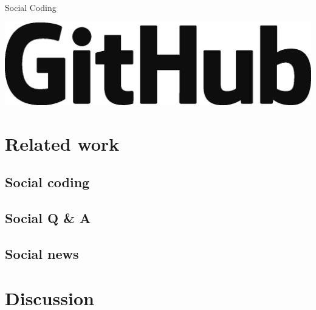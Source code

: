 \documentclass{beamer}
\newcommand{\coloreddot}[1][black]{\Large\textcolor{#1}{\ensuremath\bullet}}
\begin{document}
\begin{frame}{Social Coding}
  \begin{center}
    \includegraphics[width=.6\textwidth]{GitHub_Logo.eps}
  \end{center}
\end{frame}

\section{Related work}

\subsection{Social coding}



\subsection{Social Q \&{} A}

\subsection{Social news}




\section{Discussion}
\end{document}
